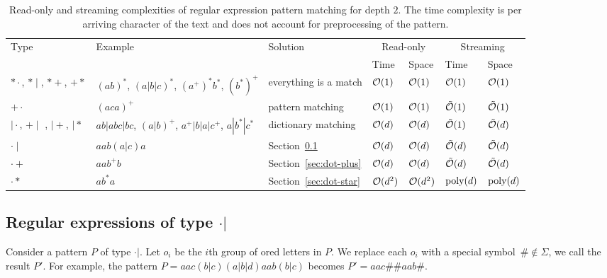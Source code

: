 \documentclass{article}
\begin{document}
\begin{table}[H]
    \centering
    \label{tab:depth2}
    
    \begin{tabularx}{\textwidth}{|l|X|X|X|X|X|X|}
   		\hline
        \multirow{2}{*}{Type} & \multirow{2}{*}{Example} & \multirow{2}{*}{Solution} & \multicolumn{2}{c|}{Read-only} & \multicolumn{2}{c|}{Streaming} 
         \\ \cline{4-7}
		 &  &  & Time & Space & Time & Space\\ \hline \hline
        
        $*\cdot$, $*\mid$, $*+$,  $+*$ & $(ab)^*$, $(a|b|c)^*$, $(a^+)^* b^*$, $(b^*)^+$  & everything is a match & $\mathcal{O}(1)$ & $\mathcal{O}(1)$ & $\mathcal{O}(1)$ & $\mathcal{O}(1)$  \\ \hline
        
        $+\cdot$  & $(aca)^+$ & pattern matching & $\mathcal{O}(1)$ & $\mathcal{O}(1)$ & $\tilde{\mathcal{O}}(1)$ & $\tilde{\mathcal{O}}(1)$  \\ \hline
        
        $\mid \cdot$, $+ \mid$ , $\mid +$, $\mid *$  & $ab|abc|bc$, $(a|b)^+ $, $a^+ | b | a | c^+$, $a | b^* | c^*$ & dictionary matching & $\mathcal{O}(d)$ & $\mathcal{O}(d)$ & $\tilde{\mathcal{O}}(1)$ & $\tilde{\mathcal{O}}(d)$ \\ \hline
        
        $\cdot \mid$  & $aab(a|c)a $& Section~\ref{sec:cdot-or} & $\mathcal{O}(d)$ & $\mathcal{O}(d)$ & $\tilde{\mathcal{O}}(d)$ & $\tilde{\mathcal{O}}(d)$  \\ \hline        
        
        $\cdot +$ & $aab^+b$ & Section~\ref{sec:dot-plus} & $\mathcal{O}(d)$ & $\mathcal{O}(d)$ & $\tilde{\mathcal{O}}(d)$ & $\tilde{\mathcal{O}}(d)$ \\ \hline
        
        $\cdot *$  & $ab^*a$& Section~\ref{sec:dot-star} & $\mathcal{O}(d^2)$ & $\mathcal{O}(d^2)$ & $\mathrm{poly}(d)$ & $\mathrm{poly}(d)$ \\ \hline
    \end{tabularx}
    \caption{Read-only and streaming complexities of regular expression pattern matching for depth $2$. The time complexity is per arriving character of the text and does not account for preprocessing of the pattern.}
\end{table}


\subsection{Regular expressions of type $\cdot|$}
\label{sec:cdot-or}
Consider a pattern $P$ of type $\cdot|$.
Let $o_i$ be the $i$th group of ored letters in $P$.
We replace each $o_i$ with a special symbol~$\# \notin \Sigma$, we call the result $P'$. For example, the pattern $P = aac(b|c)(a|b|d)aab(b|c)$ becomes $P'=aac\#\#aab\#$.
\end{document}
